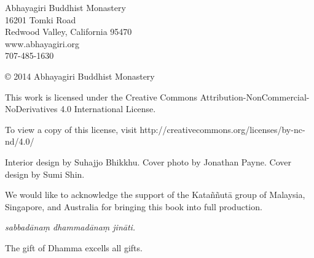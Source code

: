 \thispagestyle{empty}
{\footnotesize\raggedright
{}

\vspace{1em}
Abhayagiri Buddhist Monastery\\
16201 Tomki Road\\
Redwood Valley, California 95470\\
www.abhayagiri.org\\
707-485-1630

\vspace{1em}
\copyright{} 2014 Abhayagiri Buddhist Monastery

\vspace{1em}
This work is licensed under the Creative Commons
Attribution-NonCommercial-NoDerivatives 4.0 International License.

To view a copy of this license, visit
http://creativecommons.org/licenses/by-nc-nd/4.0/

\vspace{1em}

Interior design by Suhajjo Bhikkhu. Cover photo by Jonathan Payne. Cover
design by Sumi Shin.


\vspace{1em}

We would like to acknowledge the support of the Kataññutā group of
Malaysia, Singapore, and Australia for bringing this book into full
production.

\vspace{1em}

\textit{sabbadānaṃ dhammadānaṃ jināti.}

The gift of Dhamma excells all gifts.
}

\clearpage
